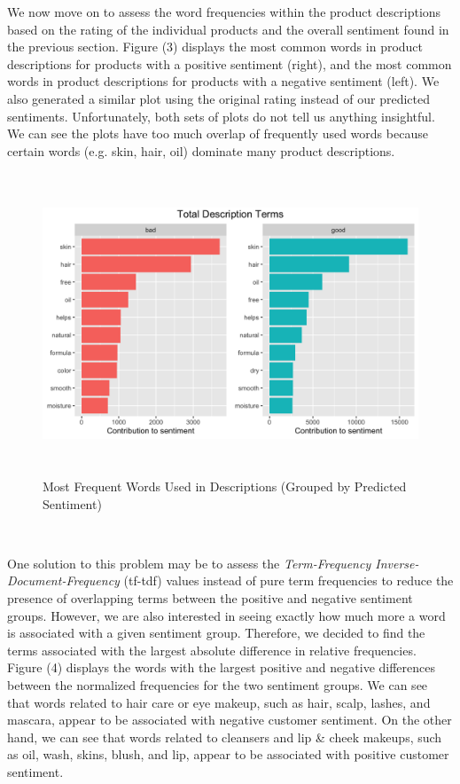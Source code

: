 \documentclass[10pt]{article}
\begin{document}
We now move on to assess the word frequencies within the product descriptions based on the rating of the individual products and the overall sentiment found in the previous section. Figure (3) displays the most common words in product descriptions for products with a positive sentiment (right), and the most common words in product descriptions for products with a negative sentiment (left). We also generated a similar plot using the original rating instead of our predicted sentiments. Unfortunately, both sets of plots do not tell us anything insightful. We can see the plots have too much overlap of frequently used words because certain words (e.g. skin, hair, oil) dominate many product descriptions. 

\begin{figure}[ht!]
    \centering
    \hspace*{-3em}
    \includegraphics[height=90mm, width=150mm]{freq_total.png}
    \caption{Most Frequent Words Used in Descriptions (Grouped by Predicted Sentiment)}
\end{figure}

\

One solution to this problem may be to assess the \textit{Term-Frequency Inverse-Document-Frequency} (tf-tdf) values instead of pure term frequencies to reduce the presence of overlapping terms between the positive and negative sentiment groups. However, we are also interested in seeing exactly how much more a word is associated with a given sentiment group. Therefore, we decided to find the terms associated with the largest absolute difference in relative frequencies. Figure (4) displays the words with the largest positive and negative differences between the normalized frequencies for the two sentiment groups. We can see that words related to hair care or eye makeup, such as hair, scalp, lashes, and mascara, appear to be associated with negative customer sentiment. On the other hand, we can see that words related to cleansers and lip \& cheek makeups, such as oil, wash, skins, blush, and lip, appear to be associated with positive customer sentiment. 
\end{document}
